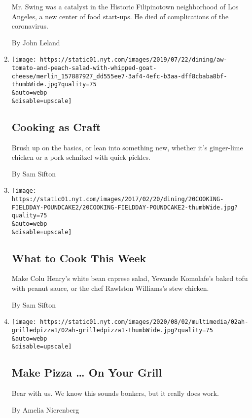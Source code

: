 \begin{enumerate}
  Mr. Swing was a catalyst in the Historic Filipinotown neighborhood of
  Los Angeles, a new center of food start-ups. He died of complications
  of the coronavirus.

  By John Leland
\item
  \href{/2020/08/03/dining/cooking-as-craft.html}{}

  \texttt{[image: https://static01.nyt.com/images/2019/07/22/dining/aw-tomato-and-peach-salad-with-whipped-goat-cheese/merlin\_157887927\_dd555ee7-3af4-4efc-b3aa-dff8cbaba8bf-thumbWide.jpg?quality=75\\\&auto=webp\\\&disable=upscale]}

  \hypertarget{cooking-as-craft}{%
  \subsection{Cooking as Craft}\label{cooking-as-craft}}

  Brush up on the basics, or lean into something new, whether it's
  ginger-lime chicken or a pork schnitzel with quick pickles.

  By Sam Sifton
\item
  \href{/2020/08/02/dining/what-to-cook-this-week.html}{}

  \texttt{[image: https://static01.nyt.com/images/2017/02/20/dining/20COOKING-FIELDDAY-POUNDCAKE2/20COOKING-FIELDDAY-POUNDCAKE2-thumbWide.jpg?quality=75\\\&auto=webp\\\&disable=upscale]}

  \hypertarget{what-to-cook-this-week}{%
  \subsection{What to Cook This Week}\label{what-to-cook-this-week}}

  Make Colu Henry's white bean caprese salad, Yewande Komolafe's baked
  tofu with peanut sauce, or the chef Rawlston Williams's stew chicken.

  By Sam Sifton
\item
  \href{/2020/08/01/at-home/coronavirus-make-pizza-on-a-grill.html}{}

  \texttt{[image: https://static01.nyt.com/images/2020/08/02/multimedia/02ah-grilledpizza1/02ah-grilledpizza1-thumbWide.jpg?quality=75\\\&auto=webp\\\&disable=upscale]}

  \hypertarget{make-pizza--on-your-grill}{%
  \subsection{Make Pizza \ldots{} On Your
  Grill}\label{make-pizza--on-your-grill}}

  Bear with us. We know this sounds bonkers, but it really does work.

  By Amelia Nierenberg
\end{enumerate}

